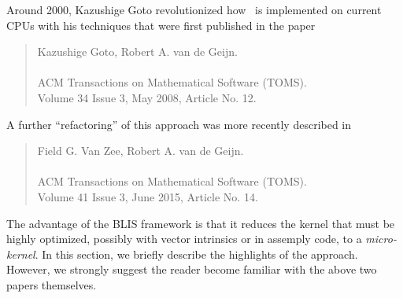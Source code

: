 Around 2000, Kazushige Goto revolutionized how \Gemm\ is implemented on current CPUs with his techniques
that were first published in the paper~\cite{Goto:2008:AHP}
\begin{quote}
	Kazushige Goto, Robert A. van de Geijn.\\
	\\
	ACM Transactions on Mathematical Software (TOMS).\\
	Volume 34 Issue 3, May 2008, Article No. 12.\\
\end{quote}
A further ``refactoring'' of this approach was more recently described in~\cite{BLIS1} 
\begin{quote}
	Field G. Van Zee, Robert A. van de Geijn. \\
	 \\
	ACM Transactions on Mathematical Software (TOMS).\\
	Volume 41 Issue 3, June 2015,
	Article No. 14. \\
\end{quote}
The advantage of the BLIS framework is that it reduces the kernel that must be highly optimized, possibly with vector intrinsics or in assemply code, to a {\em micro-kernel}.   In this section, we briefly describe the highlights of the approach.  However, we strongly suggest the reader become familiar with the above two papers themselves.

